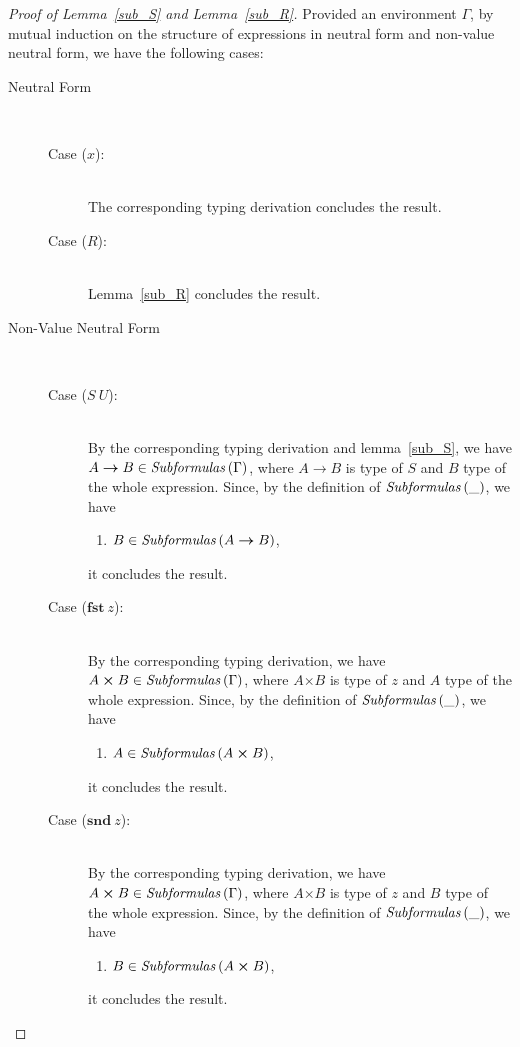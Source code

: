 \documentclass[a4paper]{article}
\newcommand{\typarr}[2]{#1\boldsymbol{\rightarrow}#2}
\newcommand{\typprd}[2]{#1\boldsymbol{\times}#2}
\newcommand{\expvar}[1]{#1}
\newcommand{\expapp}[2]{#1\ #2}
\newcommand{\expfst}[1]{\mathbf{fst}\ #1}
\newcommand{\expsnd}[1]{\mathbf{snd}\ #1}
\newcommand{\txt}[1]{\text{\textit{#1}}}
\newcommand{\subformulas}[1]{\txt{Subformulas}\,(#1)}
\begin{document}
\begin{proof}[Proof of Lemma~\ref{sub_S} and Lemma~\ref{sub_R}]
Provided an environment $\Gamma$, by mutual induction on the structure
of expressions in neutral form and non-value neutral form, we have the
following cases:

\begin{description}

\item[Neutral Form]\ \\
\begin{description}
\item[Case ($\expvar{x}$):]\ \\ 
  The corresponding typing derivation concludes the result.
\item[Case ($R$):]\ \\
  Lemma~\ref{sub_R} concludes the result.   
\end{description}


\item[Non-Value Neutral Form]\ \\
\begin{description}
\item[Case ($\expapp{S}{U}$):]\ \\ 
  By the corresponding typing derivation and lemma~\ref{sub_S}, we
  have $\typarr{A}{B} \in \subformulas{\Gamma}$, where $\typarr{A}{B}$
  is type of $S$ and $B$ type of the whole expression. Since, by the
  definition of $\subformulas{\_}$, we have
  \begin{enumerate}[] 
  \item  $B \in \subformulas{\typarr{A}{B}}$,
  \end{enumerate}
  it concludes the result.
\item[Case ($\expfst{z}$):]\ \\
  By the corresponding typing derivation, we
  have $\typprd{A}{B} \in \subformulas{\Gamma}$, where $\typprd{A}{B}$
  is type of $z$ and $A$ type of the whole expression. Since, by the
  definition of $\subformulas{\_}$, we have
  \begin{enumerate}[] 
  \item $A \in \subformulas{\typprd{A}{B}}$,
  \end{enumerate}
  it concludes the result.
\item[Case ($\expsnd{z}$):]\ \\
  By the corresponding typing derivation, we
  have $\typprd{A}{B} \in \subformulas{\Gamma}$, where $\typprd{A}{B}$
  is type of $z$ and $B$ type of the whole expression. Since, by the
  definition of $\subformulas{\_}$, we have
  \begin{enumerate}[] 
  \item $B \in \subformulas{\typprd{A}{B}}$,
  \end{enumerate}
  it concludes the result.
\end{description}
\end{description}
\end{proof}
\end{document}
